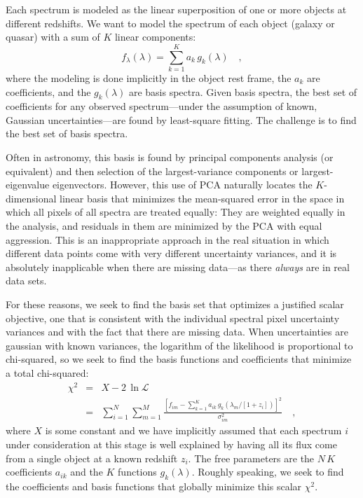 \documentclass[12pt]{article}
\newcommand{\like}{\mathscr{L}}
\begin{document}
Each spectrum is modeled as the linear superposition of one or more
objects at different redshifts.  We want to model the spectrum of each
object (galaxy or quasar) with a sum of $K$ linear components:
\begin{equation}
f_{\lambda}(\lambda) = \sum_{k=1}^{K} a_k\,g_k(\lambda)
\quad ,
\end{equation}
where the modeling is done implicitly in the object rest frame, the
$a_k$ are coefficients, and the $g_k(\lambda)$ are basis spectra.
Given basis spectra, the best set of coefficients for any observed
spectrum---under the assumption of known, Gaussian uncertainties---are
found by least-square fitting.  The challenge is to find the
best set of basis spectra.

Often in astronomy, this basis is found by principal components
analysis (or equivalent) and then selection of the largest-variance
components or largest-eigenvalue eigenvectors.  However, this use of
PCA naturally locates the $K$-dimensional linear basis that minimizes
the mean-squared error in the space in which all pixels of all spectra
are treated equally: They are weighted equally in the analysis, and
residuals in them are minimized by the PCA with equal aggression.
This is an inappropriate approach in the real situation in which
different data points come with very different uncertainty variances,
and it is absolutely inapplicable when there are missing data---as
there \emph{always} are in real data sets.

For these reasons, we seek to find the basis set that optimizes a
justified scalar objective, one that is consistent with the individual
spectral pixel uncertainty variances and with the fact that there are
missing data.  When uncertainties are gaussian with known variances,
the logarithm of the likelihood is proportional to chi-squared, so we
seek to find the basis functions and coefficients that minimize a
total chi-squared:
\begin{eqnarray}\displaystyle
\chi^2 & = & X - 2\,\ln\like \nonumber\\
 & = & \sum_{i=1}^N \sum_{m=1}^M
\frac{\left[f_{im}-\sum_{k=1}^K a_{ik}
                      \,g_k(\lambda_m/[1+z_i])\right]^2}
{\sigma^2_{im}}
\quad ,
\end{eqnarray}
where $X$ is some constant and we have implicitly assumed that each
spectrum $i$ under consideration at this stage is well explained by
having all its flux come from a single object at a known redshift
$z_i$.  The free parameters are the $N\,K$ coefficients $a_{ik}$ and
the $K$ functions $g_k(\lambda)$.  Roughly speaking, we seek to find
the coefficients and basis functions that globally minimize this
scalar $\chi^2$.
\end{document}
